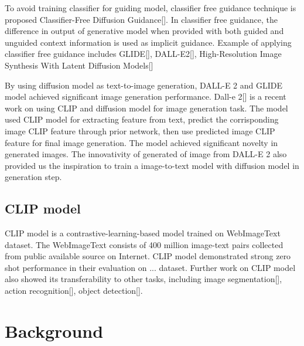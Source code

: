 \documentclass{article}
\begin{document}
To avoid training classifier for guiding model, classifier free guidance technique is proposed Classifier-Free Diffusion Guidance[]. In classifier free guidance, the difference in output of generative model when provided with both guided and unguided context information is used as implicit guidance. Example of applying classifier free guidance includes GLIDE[], DALL-E2[], High-Resolution Image Synthesis With Latent Diffusion Models[]

By using diffusion model as text-to-image generation, DALL-E 2 and GLIDE model achieved significant image generation performance. Dall-e 2[] is a recent work on using CLIP and diffusion model for image generation task. The model used CLIP model for extracting feature from text, predict the corrisponding image CLIP feature through prior network, then use predicted image CLIP feature for final image generation. The model achieved significant novelty in generated images. The innovativity of generated of image from DALL-E 2 also provided us the inspiration to train a image-to-text model with diffusion model in generation step.

\subsection{CLIP model}
CLIP model is a contrastive-learning-based model trained on WebImageText dataset. The WebImageText consists of 400 million image-text pairs collected from public available source on Internet. CLIP model demonstrated strong zero shot performance in their evaluation on ... dataset. Further work on CLIP model also showed its transferability to other tasks, including image segmentation[], action recognition[], object detection[]. 

\section{Background}
\end{document}
